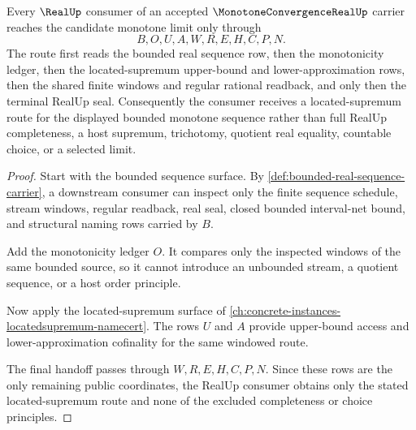 \begin{theorem}
\label{thm:monotone-convergence-real-located-supremum-route}
Every $\RealUp$ consumer of an accepted $\MonotoneConvergenceRealUp$ carrier reaches the candidate monotone limit only through
$$
B,O,U,A,W,R,E,H,C,P,N.
$$
The route first reads the bounded real sequence row, then the monotonicity ledger, then the located-supremum upper-bound and lower-approximation rows, then the shared finite windows and regular rational readback, and only then the terminal RealUp seal. Consequently the consumer receives a located-supremum route for the displayed bounded monotone sequence rather than full RealUp completeness, a host supremum, trichotomy, quotient real equality, countable choice, or a selected limit.
\end{theorem}
\begin{proof}
Start with the bounded sequence surface. By \autoref{def:bounded-real-sequence-carrier}, a downstream consumer can inspect only the finite sequence schedule, stream windows, regular readback, real seal, closed bounded interval-net bound, and structural naming rows carried by $B$.

Add the monotonicity ledger $O$. It compares only the inspected windows of the same bounded source, so it cannot introduce an unbounded stream, a quotient sequence, or a host order principle.

Now apply the located-supremum surface of \autoref{ch:concrete-instances-locatedsupremum-namecert}. The rows $U$ and $A$ provide upper-bound access and lower-approximation cofinality for the same windowed route.

The final handoff passes through $W,R,E,H,C,P,N$. Since these rows are the only remaining public coordinates, the RealUp consumer obtains only the stated located-supremum route and none of the excluded completeness or choice principles.
\end{proof}


